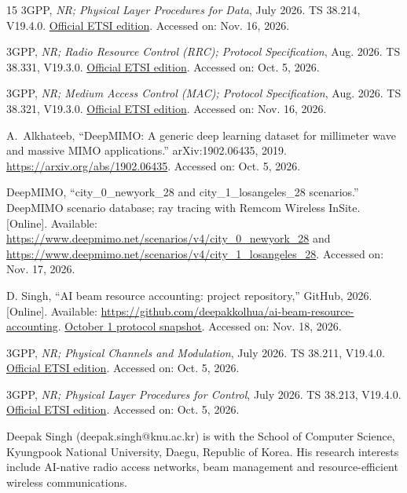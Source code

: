 \documentclass[journal,10pt]{IEEEtran}
\begin{document}
\begin{thebibliography}{15}
3GPP, {\em {NR}; Physical Layer Procedures for Data}, July 2026.
\newblock TS 38.214, V19.4.0.
  \href{https://www.etsi.org/deliver/etsi_ts/138200_138299/138214/19.04.00_60/ts_138214v190400p.pdf}{Official
  ETSI edition}. Accessed on: Nov. 16, 2026.

3GPP, {\em {NR}; Radio Resource Control ({RRC}); Protocol Specification}, Aug.
  2026.
\newblock TS 38.331, V19.3.0.
  \href{https://www.etsi.org/deliver/etsi_ts/138300_138399/138331/19.03.00_60/ts_138331v190300p.pdf}{Official
  ETSI edition}. Accessed on: Oct. 5, 2026.

3GPP, {\em {NR}; Medium Access Control ({MAC}); Protocol Specification}, Aug.
  2026.
\newblock TS 38.321, V19.3.0.
  \href{https://www.etsi.org/deliver/etsi_ts/138300_138399/138321/19.03.00_60/ts_138321v190300p.pdf}{Official
  ETSI edition}. Accessed on: Nov. 16, 2026.

A.~Alkhateeb, ``{DeepMIMO}: A generic deep learning dataset for millimeter wave
  and massive {MIMO} applications.'' arXiv:1902.06435, 2019.
\newblock \url{https://arxiv.org/abs/1902.06435}. Accessed on: Oct. 5, 2026.

{DeepMIMO}, ``{city\_0\_newyork\_28} and {city\_1\_losangeles\_28} scenarios.'' DeepMIMO scenario database; ray tracing with Remcom Wireless InSite. [Online]. Available: \url{https://www.deepmimo.net/scenarios/v4/city_0_newyork_28} and \url{https://www.deepmimo.net/scenarios/v4/city_1_losangeles_28}. Accessed on: Nov. 17, 2026.

D. Singh, ``AI beam resource accounting: project repository,'' GitHub, 2026. [Online]. Available: \url{https://github.com/deepakkolhua/ai-beam-resource-accounting}. \href{https://github.com/deepakkolhua/ai-beam-resource-accounting/blob/cf37b694731835e08de04303e0457376e6d0c685/SNAPSHOT_README.md\#L39}{October 1 protocol snapshot}. Accessed on: Nov. 18, 2026.

3GPP, {\em {NR}; Physical Channels and Modulation}, July 2026.
\newblock TS 38.211, V19.4.0.
  \href{https://www.etsi.org/deliver/etsi_ts/138200_138299/138211/19.04.00_60/ts_138211v190400p.pdf}{Official
  ETSI edition}. Accessed on: Oct. 5, 2026.

3GPP, {\em {NR}; Physical Layer Procedures for Control}, July 2026.
\newblock TS 38.213, V19.4.0.
  \href{https://www.etsi.org/deliver/etsi_ts/138200_138299/138213/19.04.00_60/ts_138213v190400p.pdf}{Official
  ETSI edition}. Accessed on: Oct. 5, 2026.

\end{thebibliography}


\begin{IEEEbiographynophoto}{Deepak Singh}
(deepak.singh@knu.ac.kr) is with the School of Computer Science, Kyungpook National University, Daegu, Republic of Korea. His research interests include AI-native radio access networks, beam management and resource-efficient wireless communications.
\end{IEEEbiographynophoto}
\end{document}
